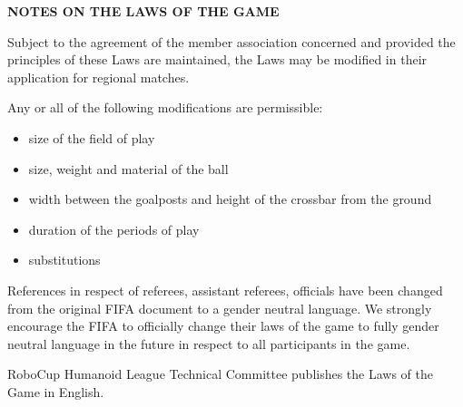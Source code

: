 \clearpage
\sffamily
{\bfseries\color[rgb]{0.4,0.4,0.4}
NOTES ON THE LAWS OF THE GAME }

\bigskip

{\color[rgb]{0.4,0.4,0.4}{Modifications} }

Subject to the agreement of the member association concerned and provided the principles of these Laws are maintained, the Laws may be modified in their application for regional matches.

Any or all of the following modifications are permissible: 

\begin{itemize}
\item size of the field of play
\item size, weight and material of the ball
\item width between the goalposts and height of the crossbar from the ground
\item duration of the periods of play
\item substitutions
\end{itemize}

\bigskip

{}

References in respect of referees, assistant referees, officials  have been changed from the original FIFA document to a gender neutral language.  We strongly encourage the FIFA to officially change their laws of the game to fully gender neutral language in the future in respect to all participants in the game.


\bigskip

{\color[rgb]{0.4,0.4,0.4}{Official languages}}

RoboCup Humanoid League Technical Committee publishes the Laws of the Game in English.

